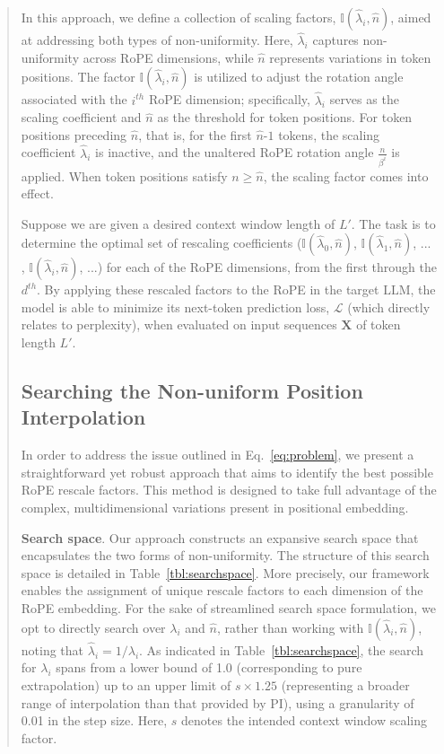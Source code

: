 \begin{abstract}
In this approach, we define a collection of scaling factors, $\mathbb{I}(\hat{\lambda}_{i},\hat{n})$, aimed at addressing both types of non-uniformity. Here, $\hat{\lambda}_i$ captures non-uniformity across RoPE dimensions, while $\hat{n}$ represents variations in token positions. The factor $\mathbb{I}(\hat{\lambda}_{i},\hat{n})$ is utilized to adjust the rotation angle associated with the $i^{th}$ RoPE dimension; specifically, $\hat\lambda_{i}$ serves as the scaling coefficient and $\hat{n}$ as the threshold for token positions. For token positions preceding $\hat{n}$, that is, for the first $\hat{n}$-$1$ tokens, the scaling coefficient $\hat\lambda_{i}$ is inactive, and the unaltered RoPE rotation angle $\frac{n}{\beta^i}$ is applied. When token positions satisfy $n \geq \hat{n}$, the scaling factor comes into effect.

Suppose we are given a desired context window length of $L'$. The task is to determine the optimal set of rescaling coefficients ($\mathbb{I}(\hat{\lambda}_{0},\hat{n})$, $\mathbb{I}(\hat{\lambda}_{1},\hat{n})$, ... , $\mathbb{I}(\hat{\lambda}_{i},\hat{n})$, ...) for each of the RoPE dimensions, from the first through the $d^{th}$. By applying these rescaled factors to the RoPE in the target $\text{LLM}$, the model is able to minimize its next-token prediction loss, $\mathcal{L}$ (which directly relates to perplexity), when evaluated on input sequences $\mathbf{X}$ of token length $L'$.

\subsection{Searching the Non-uniform Position Interpolation}

In order to address the issue outlined in Eq.~\ref{eq:problem}, we present a straightforward yet robust approach that aims to identify the best possible RoPE rescale factors. This method is designed to take full advantage of the complex, multidimensional variations present in positional embedding.

\textbf{Search space}. Our approach constructs an expansive search space that encapsulates the two forms of non-uniformity. The structure of this search space is detailed in Table~\ref{tbl:searchspace}. More precisely, our framework enables the assignment of unique rescale factors to each dimension of the RoPE embedding. For the sake of streamlined search space formulation, we opt to directly search over $\lambda_i$ and $\hat{n}$, rather than working with $\mathbb{I}(\hat{\lambda}_{i},\hat{n})$, noting that $\hat{\lambda}_{i}=1/\lambda_i$. As indicated in Table~\ref{tbl:searchspace}, the search for $\lambda_i$ spans from a lower bound of 1.0 (corresponding to pure extrapolation) up to an upper limit of $s\times1.25$ (representing a broader range of interpolation than that provided by PI), using a granularity of 0.01 in the step size. Here, $s$ denotes the intended context window scaling factor.


\end{abstract}
